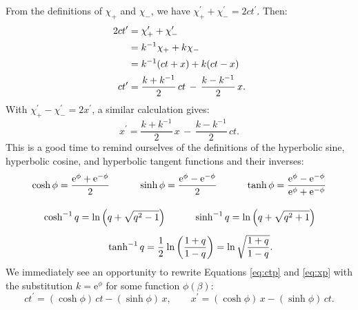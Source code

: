 \documentclass[12pt]{article}
\begin{document}
From the definitions of $\chi_+$ and $\chi_-$, we have $\chi_+^{\prime} + \chi_-^{\prime} = 2ct^{\prime}$. Then:
\begin{equation}\label{eq:ctp}
\begin{split}
2 ct^{\prime} &= \chi_+^{\prime} + \chi_-^{\prime} \\[1pt]
&= k^{-1} \mkern.5mu \chi_+ + k \mkern.5mu \chi_- \\[1pt]
&= k^{-1} (ct + x) + k (ct - x) \\[1pt]
ct^{\prime} &= \dfrac{k + k^{-1}}{2} \, ct \, - \, \dfrac{k - k^{-1}}{2} \, x.
\end{split}
\end{equation}
With $\chi_+^{\prime} - \chi_-^{\prime} = 2x^{\prime}$, a similar calculation gives:
\begin{equation}\label{eq:xp}
x^{\prime} = \dfrac{k + k^{-1}}{2} \, x \, - \, \dfrac{k - k^{-1}}{2} \, ct .
\end{equation}
This is a good time to remind ourselves of the definitions of the hyperbolic sine, hyperbolic cosine, and hyperbolic tangent functions and their inverses:
\begin{equation}\label{eq:hf}
\begin{aligned}
\cosh{\phi} = \dfrac{\mathrm{e}^\phi + \mathrm{e}^{-\phi}}{2} \qquad \quad \sinh{\phi} &= \dfrac{\mathrm{e}^\phi - \mathrm{e}^{-\phi}}{2} \qquad \quad \tanh{\phi} = \dfrac{\mathrm{e}^\phi - \mathrm{e}^{-\phi}}{\mathrm{e}^\phi + \mathrm{e}^{-\phi}} \\[10pt]
\cosh^{-1}{q} = \ln{ \left( q + \sqrt{q^2 - 1} \right)} &\qquad \quad \sinh^{-1}{q} = \ln{ \left( q + \sqrt{q^2 + 1} \right)} \\[5pt]
\tanh^{-1}{q} = \dfrac{1}{2} \mkern1mu & \ln \left( \dfrac{1 + q}{1 - q} \right) = \ln \sqrt{\frac{1 + q}{1 - q}} .
\end{aligned}
\end{equation}
We immediately see an opportunity to rewrite Equations \ref{eq:ctp} and \ref{eq:xp} with the substitution $k = \mathrm{e}^{\phi}$ for some function $\phi (\beta)$:
\begin{equation*}
ct^{\prime} = ( \cosh \phi ) \, ct - ( \sinh \phi ) \, x , \qquad x^{\prime} = ( \cosh \phi ) \, x - ( \sinh \phi ) \, ct .
\end{equation*}
\end{document}
